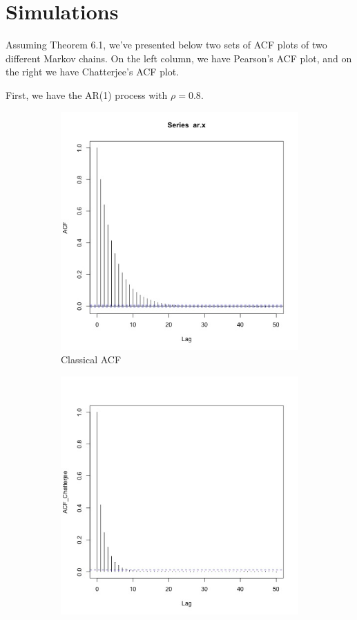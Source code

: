\documentclass{article}
\begin{document}
\section{Simulations}
	Assuming Theorem 6.1, we've presented below two sets of ACF plots of two different Markov chains.
	On the left column, we have Pearson's ACF plot, and on the right we have Chatterjee's ACF plot.

	First, we have the AR(1) process with $\rho = 0.8$.
	\begin{figure}[H]
		\centering
		\begin{subfigure}[b]{0.4\linewidth}
			\includegraphics[width=\linewidth]{acf_ar.jpg}
			\caption{Classical ACF}
		\end{subfigure}
		\begin{subfigure}[b]{0.4\linewidth}
			\includegraphics[width=\linewidth]{acf_ar_chatterjee.jpg}

\end{subfigure}
\end{figure}
\end{document}
